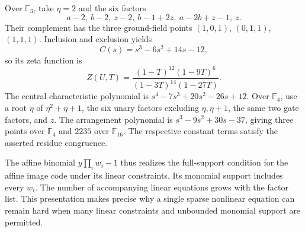 \begin{example}
\label{ar:example}
Over $\mathbb F_3$, take $\eta=2$ and the six factors
\[
 a-2,\ b-2,\ z-2,\ b-1+2z,\ a-2b+z-1,\ z.
\]
Their complement has the three ground-field points $(1,0,1)$, $(0,1,1)$, $(1,1,1)$. Inclusion and exclusion yields
\[
 C(s)=s^3-6s^2+14s-12,
\]
so its zeta function is
\[
 Z(U,T)=\frac{(1-T)^{12}(1-9T)^6}
                  {(1-3T)^{14}(1-27T)}.
\]
The central characteristic polynomial is $s^4-7s^3+20s^2-26s+12$. Over $\mathbb F_4$, use a root $\eta$ of $\eta^2+\eta+1$, the six unary factors excluding $\eta,\eta+1$, the same two gate factors, and $z$. The arrangement polynomial is $s^3-9s^2+30s-37$, giving three points over $\mathbb F_4$ and $2235$ over $\mathbb F_{16}$. The respective constant terms satisfy the asserted residue congruence.
\end{example}

The affine binomial $y\prod_iw_i-1$ thus realizes the full-support condition for the affine image code under its linear constraints. Its monomial support includes every $w_i$. The number of accompanying linear equations grows with the factor list. This presentation makes precise why a single sparse nonlinear equation can remain hard when many linear constraints and unbounded monomial support are permitted.

